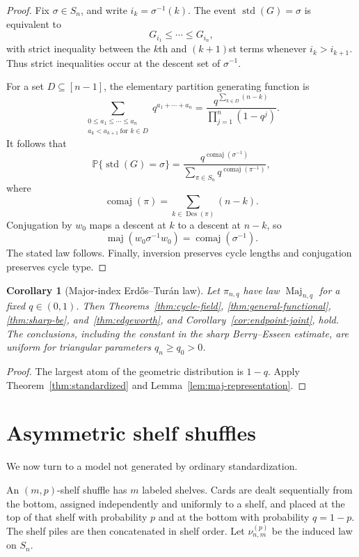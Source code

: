 \documentclass[11pt]{article}
\newtheorem{corollary}[theorem]{Corollary}
\theoremstyle{definition}
\theoremstyle{remark}
\newcommand{\Pp}{\mathbb P}
\begin{document}
\begin{proof}
Fix $\sigma\in S_n$, and write $i_k=\sigma^{-1}(k)$.  The event
$\operatorname{std}(G)=\sigma$ is equivalent to
\[
 G_{i_1}\le\cdots\le G_{i_n},
\]
with strict inequality between the $k$th and $(k+1)$st terms whenever
$i_k>i_{k+1}$.  Thus strict inequalities occur at the descent set of
$\sigma^{-1}$.

For a set $D\subseteq[n-1]$, the elementary partition generating function
is
\[
 \sum_{\substack{0\le a_1\le\cdots\le a_n\\
                  a_k<a_{k+1}\ \text{for }k\in D}}
 q^{a_1+\cdots+a_n}
 =
 \frac{q^{\sum_{k\in D}(n-k)}}{\prod_{j=1}^n(1-q^j)}.
\]
It follows that
\[
 \Pp\{\operatorname{std}(G)=\sigma\}
 =
 \frac{q^{\operatorname{comaj}(\sigma^{-1})}}
      {\sum_{\pi\in S_n}q^{\operatorname{comaj}(\pi^{-1})}},
\]
where
\[
 \operatorname{comaj}(\pi)
 =
 \sum_{k\in\operatorname{Des}(\pi)}(n-k).
\]
Conjugation by $w_0$ maps a descent at $k$ to a descent at $n-k$, so
\[
 \operatorname{maj}(w_0\sigma^{-1}w_0)
 =
 \operatorname{comaj}(\sigma^{-1}).
\]
The stated law follows.  Finally, inversion preserves cycle lengths and
conjugation preserves cycle type.
\end{proof}

\begin{corollary}[Major-index Erd\H{o}s--Tur\'an law]
\label{cor:maj}
Let $\pi_{n,q}$ have law $\operatorname{Maj}_{n,q}$ for a fixed
$q\in(0,1)$.  Then Theorems~\ref{thm:cycle-field},
\ref{thm:general-functional}, \ref{thm:sharp-be}, and~\ref{thm:edgeworth},
and Corollary~\ref{cor:endpoint-joint}, hold.  The conclusions, including the
constant in the sharp Berry--Esseen estimate, are uniform for triangular
parameters $q_n\ge q_0>0$.
\end{corollary}

\begin{proof}
The largest atom of the geometric distribution is $1-q$.  Apply
Theorem~\ref{thm:standardized} and
Lemma~\ref{lem:maj-representation}.
\end{proof}

\section{Asymmetric shelf shuffles}

We now turn to a model not generated by ordinary standardization.

An $(m,p)$-shelf shuffle has $m$ labeled shelves.  Cards are dealt
sequentially from the bottom, assigned independently and uniformly to a
shelf, and placed at the top of that shelf with probability $p$ and at the
bottom with probability $q=1-p$.  The shelf piles are then concatenated in
shelf order.  Let $\nu_{n,m}^{(p)}$ be the induced law on $S_n$.
\end{document}
